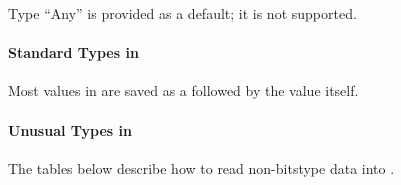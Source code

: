 \documentclass[letterpaper,11pt,english]{sphinxmanual}
\begin{document}
\begin{sphinxVerbatim}[commandchars=\\\{\}]
   
 
    
     
      
     
      
     
        
     
        
     
        
     
        
     
        
   
\end{sphinxVerbatim}

Type “Any” is provided as a default; it is not supported.


\paragraph{Standard Types in }
\label{\detokenize{src/Appendices/seisdata_fileformat:standard-types-in-misc}}
Most values in  are saved as a {\hyperref[\detokenize{src/Appendices/seisdata_fileformat:smt}]{}} followed by the value itself.


\paragraph{Unusual Types in }
\label{\detokenize{src/Appendices/seisdata_fileformat:unusual-types-in-misc}}
The tables below describe how to read non-bitstype data into .
\end{document}

